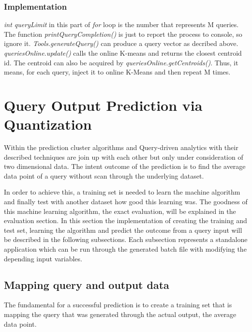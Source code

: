 \documentclass{lmproj}
\begin{document}
\subsubsection{Implementation}


\textit{int queryLimit} in this part of \textit{for} loop is the number that represents M queries. The function \textit{printQueryCompletion()} is just to report the process to console, so ignore it. \textit{Tools.generateQuery()} can produce a query vector as decribed above. \textit{queriesOnline.update()} calls the online K-means and returns the closest centroid id. The centroid can also be acquired by \textit{queriesOnline.getCentroids()}. Thus, it means, for each query, inject it to online K-Means and then repeat M times. 


\clearpage
\section{Query Output Prediction via Quantization}
Within the prediction cluster algorithms and Query-driven analytics with their described techniques are join up with each other but only under consideration of two dimensional data. The intent outcome of the prediction is to find the average data point of a query without scan through the underlying dataset. 

In order to achieve this, a training set is needed to learn the machine algorithm and finally test with another dataset how good this learning was. The goodness of this machine learning algorithm, the exact evaluation, will be explained in the evaluation section. In this section the implementation of creating the training and test set, learning the algorithm and predict the outcome from a query input will be described in the following subsections. Each subsection represents a standalone application which can be run through the generated batch file with modifying the depending input variables. 

\subsection{Mapping query and output data}

The fundamental for a successful prediction is to create a training set that is mapping the query that was generated through the actual output, the average data point.
\end{document}

